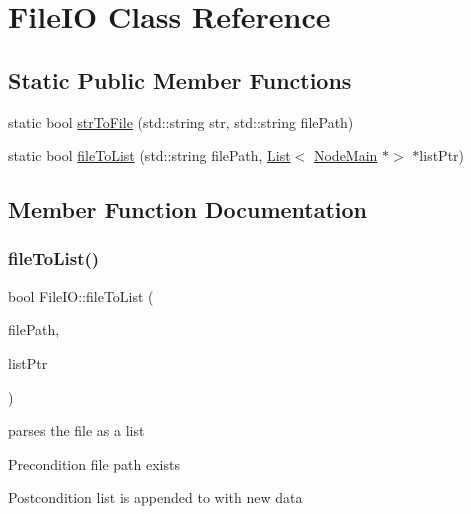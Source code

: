 \hypertarget{class_file_i_o}{}\section{File\+IO Class Reference}
\label{class_file_i_o}
\subsection*{Static Public Member Functions}
\begin{DoxyCompactItemize}
\item 
static bool \hyperlink{class_file_i_o_ac3a2546c33e52aab6f4b9376d5c41d5e}{str\+To\+File} (std\+::string str, std\+::string file\+Path)
\item 
static bool \hyperlink{class_file_i_o_a7ef3f816ce047c60c887c38f3a9717d7}{file\+To\+List} (std\+::string file\+Path, \hyperlink{class_list}{List}$<$ \hyperlink{class_node_main}{Node\+Main} $\ast$$>$ $\ast$list\+Ptr)
\end{DoxyCompactItemize}


\subsection{Member Function Documentation}
\mbox{\label{class_file_i_o_a7ef3f816ce047c60c887c38f3a9717d7}} 
\subsubsection{\texorpdfstring{file\+To\+List()}{fileToList()}}
{\footnotesize\ttfamily bool File\+I\+O\+::file\+To\+List (\begin{DoxyParamCaption}\item[{std\+::string}]{file\+Path,  }\item[{\hyperlink{class_list}{List}$<$ \hyperlink{class_node_main}{Node\+Main} $\ast$$>$ $\ast$}]{list\+Ptr }\end{DoxyParamCaption})\hspace{0.3cm}{\ttfamily [static]}}

parses the file as a list \begin{DoxyPrecond}{Precondition}
file path exists 
\end{DoxyPrecond}
\begin{DoxyPostcond}{Postcondition}
list is appended to with new data 
\end{DoxyPostcond}

